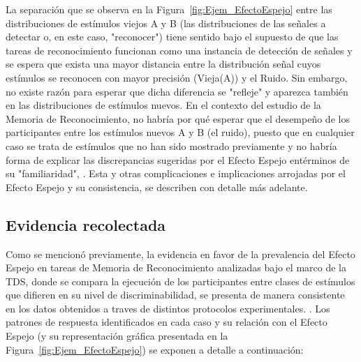 La separación que se observa en la Figura~\ref{fig:Ejem_EfectoEspejo} entre las distribuciones de estímulos viejos A y B (las distribuciones de las señales a detectar o, en este caso, "reconocer") tiene sentido bajo el supuesto de que las tareas de reconocimiento funcionan como una instancia de detección de señales y se espera que exista una mayor distancia entre la distribución señal cuyos estímulos se reconocen con mayor precisión (Vieja(A)) y el Ruido. Sin embargo, no existe razón para esperar que dicha diferencia se "refleje" y aparezca también en las distribuciones de estímulos nuevos. En el contexto del estudio de la Memoria de Reconocimiento, no habría por qué esperar que el desempeño de los participantes entre los estímulos nuevos A y B (el ruido), puesto que en cualquier caso se trata de  estímulos que no han sido mostrado previamente y no habría forma de explicar las discrepancias sugeridas por el Efecto Espejo entérminos de su "familiaridad", \parencite{Glanzer1993}. Esta y otras complicaciones e implicaciones arrojadas por el Efecto Espejo y su consistencia, se describen con detalle más adelante.\\

\subsection{Evidencia recolectada}

Como se mencionó previamente, la evidencia en favor de la prevalencia del Efecto Espejo en tareas de Memoria de Reconocimiento analizadas bajo el marco de la TDS, donde se compara la ejecución de los participantes entre clases de estímulos que difieren en su nivel de discriminabilidad, se presenta de manera consistente en los datos obtenidos a traves de distintos protocolos experimentales. \parencite{Glanzer1990, Glanzer1993}. Los patrones de respuesta identificados en cada caso y su relación con el Efecto Espejo (y su representación gráfica presentada en la Figura~\ref{fig:Ejem_EfectoEspejo}) se exponen a detalle a continuación:\\

